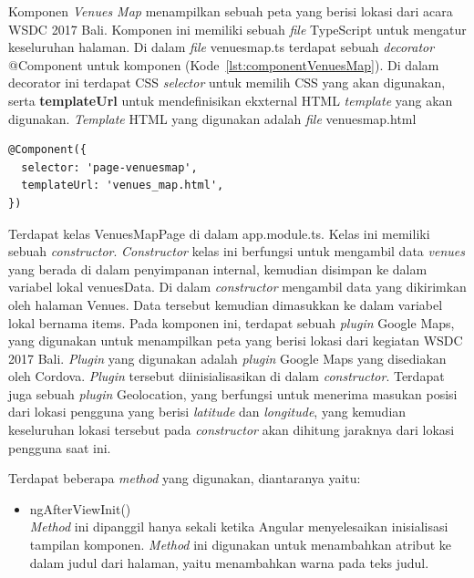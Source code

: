 \begin{enumerate}
\begin{enumerate}
		Komponen \textit{Venues Map} menampilkan sebuah peta yang berisi lokasi dari acara WSDC 2017 Bali. Komponen ini memiliki sebuah \textit{file} TypeScript untuk mengatur keseluruhan halaman. Di dalam \textit{file} venues\textunderscore map.ts terdapat sebuah \textit{decorator} @Component untuk komponen (Kode~\ref{lst:componentVenuesMap}). Di dalam decorator ini terdapat CSS \textit{selector} untuk memilih CSS yang akan digunakan, serta \textbf{templateUrl} untuk mendefinisikan ekxternal HTML \textit{template} yang akan digunakan. \textit{Template} HTML yang digunakan adalah \textit{file} venues\textunderscore map.html
	
\begin{lstlisting}[label={lst:componentVenuesMap}, caption=@Component pada venues\textunderscore map.ts]
@Component({
  selector: 'page-venuesmap',
  templateUrl: 'venues_map.html',
})
\end{lstlisting}	

	Terdapat kelas VenuesMapPage di dalam app.module.ts. Kelas ini memiliki sebuah \textit{constructor}. \textit{Constructor} kelas ini berfungsi untuk mengambil data \textit{venues} yang berada di dalam penyimpanan internal, kemudian disimpan ke dalam variabel lokal venuesData. Di dalam \textit{constructor} mengambil data yang dikirimkan oleh halaman Venues. Data tersebut kemudian dimasukkan ke dalam variabel lokal bernama items. 	
	\newpage
	Pada komponen ini, terdapat sebuah \textit{plugin} Google Maps, yang digunakan untuk menampilkan peta yang berisi lokasi dari kegiatan WSDC 2017 Bali. \textit{Plugin} yang digunakan adalah \textit{plugin} Google Maps yang disediakan oleh Cordova. \textit{Plugin} tersebut diinisialisasikan di dalam \textit{constructor}. Terdapat juga sebuah \textit{plugin} Geolocation, yang berfungsi untuk menerima masukan posisi dari lokasi pengguna yang berisi \textit{latitude} dan \textit{longitude}, yang kemudian keseluruhan lokasi tersebut pada \textit{constructor} akan dihitung jaraknya dari lokasi pengguna saat ini. 
	
	Terdapat beberapa \textit{method} yang digunakan, diantaranya yaitu:
	
	\begin{itemize}
		\item ngAfterViewInit()\\
		\textit{Method} ini dipanggil hanya sekali ketika Angular menyelesaikan inisialisasi tampilan komponen. \textit{Method} ini digunakan untuk menambahkan atribut ke dalam judul dari halaman, yaitu menambahkan warna pada teks judul.
	

\end{itemize}
\end{enumerate}
\end{enumerate}
